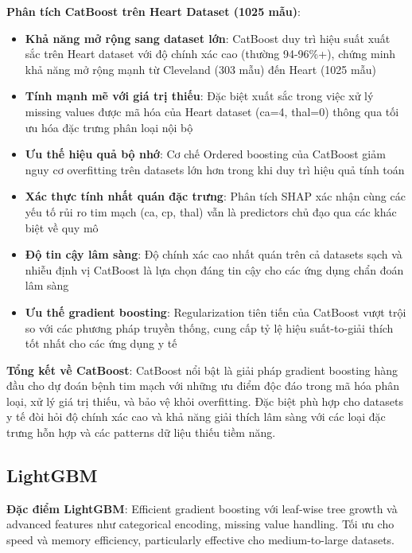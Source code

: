 \textbf{Phân tích CatBoost trên Heart Dataset (1025 mẫu)}:
\begin{itemize}[leftmargin=*]
    \item \textbf{Khả năng mở rộng sang dataset lớn}: CatBoost duy trì hiệu suất xuất sắc trên Heart dataset với độ chính xác cao (thường 94-96\%+), chứng minh khả năng mở rộng mạnh từ Cleveland (303 mẫu) đến Heart (1025 mẫu)
    \item \textbf{Tính mạnh mẽ với giá trị thiếu}: Đặc biệt xuất sắc trong việc xử lý missing values được mã hóa của Heart dataset (ca=4, thal=0) thông qua tối ưu hóa đặc trưng phân loại nội bộ
    \item \textbf{Ưu thế hiệu quả bộ nhớ}: Cơ chế Ordered boosting của CatBoost giảm nguy cơ overfitting trên datasets lớn hơn trong khi duy trì hiệu quả tính toán
    \item \textbf{Xác thực tính nhất quán đặc trưng}: Phân tích SHAP xác nhận cùng các yếu tố rủi ro tim mạch (ca, cp, thal) vẫn là predictors chủ đạo qua các khác biệt về quy mô
    \item \textbf{Độ tin cậy lâm sàng}: Độ chính xác cao nhất quán trên cả datasets sạch và nhiễu định vị CatBoost là lựa chọn đáng tin cậy cho các ứng dụng chẩn đoán lâm sàng
    \item \textbf{Ưu thế gradient boosting}: Regularization tiên tiến của CatBoost vượt trội so với các phương pháp truyền thống, cung cấp tỷ lệ hiệu suất-to-giải thích tốt nhất cho các ứng dụng y tế
\end{itemize}

\textbf{Tổng kết về CatBoost}: CatBoost nổi bật là giải pháp gradient boosting hàng đầu cho dự đoán bệnh tim mạch với những ưu điểm độc đáo trong mã hóa phân loại, xử lý giá trị thiếu, và bảo vệ khỏi overfitting. Đặc biệt phù hợp cho datasets y tế đòi hỏi độ chính xác cao và khả năng giải thích lâm sàng với các loại đặc trưng hỗn hợp và các patterns dữ liệu thiếu tiềm năng.

\FloatBarrier

\subsection{LightGBM}\label{subsec:lightgbm}

\textbf{Đặc điểm LightGBM}: Efficient gradient boosting với leaf-wise tree growth và advanced features như categorical encoding, missing value handling. Tối ưu cho speed và memory efficiency, particularly effective cho medium-to-large datasets.

